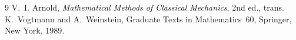 \begin{thebibliography}{9}
   V.~I. Arnold, \emph{Mathematical Methods of Classical
    Mechanics}, 2nd ed., trans. K.~Vogtmann and A.~Weinstein, Graduate Texts
    in Mathematics~60, Springer, New York, 1989.
\end{thebibliography}
